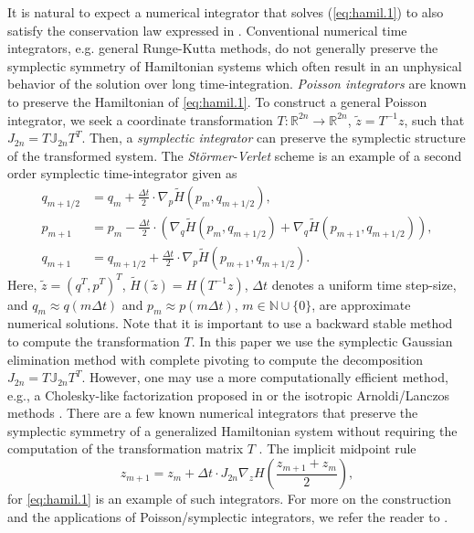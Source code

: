 It is natural to expect a numerical integrator that solves (\ref{eq:hamil.1}) to also satisfy the conservation law expressed in  . Conventional numerical time integrators, e.g. general Runge-Kutta methods, do not generally preserve the symplectic symmetry of Hamiltonian systems which often result in an unphysical behavior of the solution over long time-integration. \emph{Poisson integrators} \cite{Hairer:1250576} are known to preserve the Hamiltonian of \eqref{eq:hamil.1}. To construct a general Poisson integrator, we seek a coordinate transformation $T:\mathbb R^{2n}\to\mathbb R^{2n}$, $\tilde z = T^{-1}z$, such that $J_{2n} = T \mathbb J_{2n} T^T$. Then, a \emph{symplectic integrator} can preserve the symplectic structure of the transformed system. The \emph{St\"ormer-Verlet} scheme is an example of a second order symplectic time-integrator given as
\begin{equation} \label{eq:hamil.6}
	\begin{aligned}
	q_{m+1/2} &= q_m + \frac{\Delta t} 2 \cdot \nabla_p \tilde H(p_m,q_{m+1/2}), \\
	p_{m+1} &= p_m - \frac{\Delta t} 2  \cdot \left( \nabla_q \tilde H(p_m,q_{m+1/2}) + \nabla_{q} \tilde H(p_{m+1},q_{m+1/2}) \right), \\
	q_{m+1} &= q_{m+1/2} + \frac{\Delta t} 2  \cdot  \nabla_p \tilde H(p_{m+1},q_{m+1/2}).
	\end{aligned}
\end{equation}
Here, $\tilde z = (q^T,p^T)^T$, $\tilde H(\tilde z) = H(T^{-1}z)$, $\Delta t$ denotes a uniform time step-size, and $q_m \approx q(m\Delta t)$ and $p_m \approx p(m\Delta t)$, $m \in \mathbb{N} \cup \{ 0\}$, are approximate numerical solutions. Note that it is important to use a backward stable method to compute the transformation $T$. In this paper we use the symplectic Gaussian elimination method with complete pivoting to compute the decomposition $J_{2n} = T \mathbb J_{2n} T^T$. However, one may use a more computationally efficient method, e.g., a Cholesky-like factorization proposed in \cite{benner:chol} or the isotropic Arnoldi/Lanczos methods \cite{doi:10.1137/S1064827500366434}. There are a few known numerical integrators that preserve the symplectic symmetry of a generalized Hamiltonian system without requiring the computation of the transformation matrix $T$ \cite{Hairer:1250576}. The implicit midpoint rule
\begin{equation} \label{eq:hamil.7}
	z_{m+1} = z_{m} + \Delta t \cdot J_{2n} \nabla_z H \left( \frac{z_{m+1} + z_m}{2} \right),
\end{equation}
for \cref{eq:hamil.1} is an example of such integrators. For more on the construction and the applications of Poisson/symplectic integrators, we refer the reader to \cite{Hairer:1250576,bhatt2017structure}.
